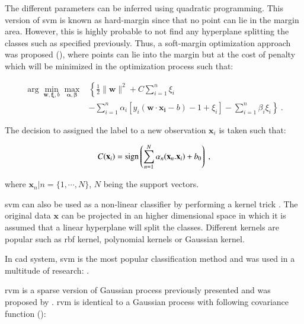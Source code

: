\begin{enumerate}[leftmargin=*]
The different parameters can be inferred using quadratic programming. This version of \ac{svm} is known as hard-margin since that no point can lie in the margin area. However, this is highly probable to not find any hyperplane splitting the classes such as specified previously. Thus, a soft-margin optimization approach was proposed (\cite{Cortes1995}), where points can lie into the margin but at the cost of penalty which will be minimized in the optimization process such that:

\begin{equation}
\begin{aligned}
\arg\min_{\mathbf{w},\mathbf{\xi}, b } \max_{\boldsymbol{\alpha},\boldsymbol{\beta} } & \left\{ \frac{1}{2}\|\mathbf{w}\|^2+C \sum_{i=1}^n \xi_i \right. \\
 & \left. - \sum_{i=1}^{n}{\alpha_i[y_i(\mathbf{w}\cdot \mathbf{x_i} - b) -1 + \xi_i]} - \sum_{i=1}^{n} \beta_i \xi_i \right\} \ .
\end{aligned}
\end{equation}

The decision to assigned the label to a new observation $\mathbf{x}_i$ is taken such that:

\begin{equation}
	C(\mathbf{x}_i) = \operatorname*{sign} \left( \sum_{n=1}^{N} \alpha_n (\mathbf{x}_n . \mathbf{x}_i) + b_0 \right) \ ,
	\label{eq:svmdec} 
\end{equation}

\noindent where $\mathbf{x}_n|n=\{1,\cdots,N\}$, $N$ being the support vectors.

\ac{svm} can also be used as a non-linear classifier by performing a kernel trick \cite{Boser1992}. The original data $\mathbf{x}$ can be projected in an higher dimensional space in which it is assumed that a linear hyperplane will split the classes. Different kernels are popular such as \ac{rbf} kernel, polynomial kernels or Gaussian kernel.

In \ac{cad} system, \ac{svm} is the most popular classification method and was used in a multitude of research: \cite{Artan2009,Artan2010,Chan2003,Kelm2007,Litjens2011,Litjens2012,Liu2013,Lopes2011,Niaf2011,Niaf2012,Ozer2009,Ozer2010,Parfait2012,Peng2013,Sung2011,Tiwari2012,Vos2008,Vos2008a,Vos2010,Vos2012}.

\Acf{rvm} is a sparse version of Gaussian process previously presented and was proposed by \cite{Tipping2001}. \ac{rvm} is identical to a Gaussian process with following covariance function (\cite{Quinonero-Candela2002}):


\end{enumerate}
